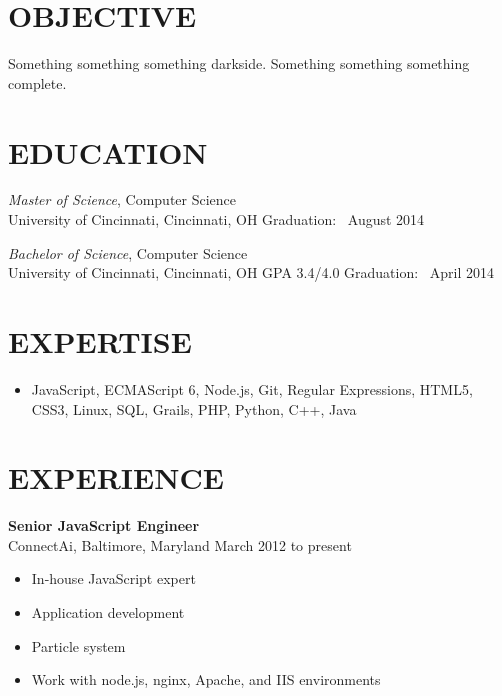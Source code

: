 \documentclass[11pt, line]{res}
\begin{document}
	\address{
			8228 Melrose Ln\\ Maineville, OH 45039\\ 513-259-0656\\ ross@rhadden.com
	}

	\begin{resume}
		\section{OBJECTIVE}
			Something something something darkside.  Something something something complete.

		\section{EDUCATION}
			\textit{Master of Science},
				Computer Science \\
				University of Cincinnati, Cincinnati, OH
				\hfill
					Graduation: \ August 2014

			\textit{Bachelor of Science},
				Computer Science \\
				University of Cincinnati, Cincinnati, OH
				\hspace{16pt}
					GPA 3.4/4.0
				\hfill
					Graduation: \ April 2014

		\section{EXPERTISE}
			\begin{itemize}[leftmargin=0pt]
				\item[]
					JavaScript,
					ECMAScript 6,
					Node.js,
					Git,
					Regular Expressions,
					HTML5,
					CSS3,
					Linux,
					SQL,
					Grails,
					PHP,
					Python,
					C++,
					Java
			\end{itemize}

		\section{EXPERIENCE}
				\textbf{Senior JavaScript Engineer} \\
				ConnectAi,\; Baltimore, Maryland
				\hfill March 2012 to present \

				\begin{itemize}
					\item In-house JavaScript expert
					\item Application development
					\item Particle system
					\item Work with node.js, nginx, Apache, and IIS environments
				\end{itemize}


\end{resume}
\end{document}
